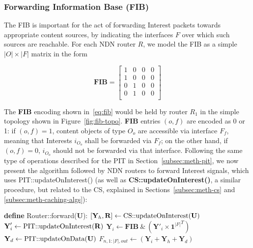 \subsubsection{Forwarding Information Base (FIB)}
\label{subsec:meth-fib}

The FIB is important for the act of forwarding Interest packets towards 
appropriate content sources, by indicating the interfaces $F$ over which such 
sources are reachable. For each NDN router $R$, we model the FIB as a simple 
$|O| \times |F|$ matrix in the form

\begin{equation}
\textbf{FIB} = \begin{bmatrix} 1 & 0 & 0 & 0  \\ 
                1 & 0 & 0 & 0               \\ 
                0 & 1 & 0 & 0               \\ 
                0 & 1 & 0 & 0               \\ \end{bmatrix}
    \label{eq:fib}
\end{equation}\shortvertbreak

The \textbf{FIB} encoding shown in~\ref{eq:fib} would be held by router $R_1$ in the 
simple topology shown in Figure~\ref{fig:fib-topo}. \textbf{FIB} entries 
$(o,f)$ are encoded as 0 or 1: if $(o,f) = 1$, content objects of 
type $O_o$ are accessible via interface $F_f$, meaning that Interests 
$i_{O_o}$ shall be forwarded via $F_f$; on the other hand, 
if $(o,f) = 0$, $i_{O_o}$ should not be forwarded via that interface. 
Following the same type of operations described for the PIT 
in Section~\ref{subsec:meth-pit}, we now present the algorithm followed by NDN 
routers to forward Interest signals, which uses PIT::updateOnInterest() (as well as \textbf{CS::updateOnInterest()}, a similar procedure, but 
related to the CS, explained in Sections~\ref{subsec:meth-cs} and 
\ref{subsec:meth-caching-algs}):\shortvertbreak 

\begin{algorithmic}[1]

\State \textbf{define} Router::forward($\textbf{U}$):
\State
    \State $[\textbf{Y}_h, \textbf{R}] \leftarrow \text{CS::updateOnInterest(\textbf{U})}$
    \State $\textbf{Y}'_i \leftarrow \text{PIT::updateOnInterest(\textbf{R})}$
    \State $\textbf{Y}_i \leftarrow \textbf{FIB} \ \& \ (\textbf{Y}'_i \times {\textbf{1}^{|F|}}^{T})$
    \State $\textbf{Y}_d \leftarrow \text{PIT::updateOnData(\textbf{U})}$
    \State $F_{n,1:|F|,out} \leftarrow (\textbf{Y}_i + \textbf{Y}_h + \textbf{Y}_d)$

\end{algorithmic}\shortvertbreak

